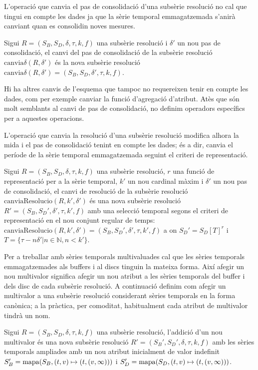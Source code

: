 L'operació que canvia el pas de consolidació d'una subsèrie resolució
no cal que tingui en compte les dades ja que la sèrie temporal
emmagatzemada s'anirà canviant quan es consolidin noves mesures.
\begin{definition}
  Sigui $R = (S_B,S_D,\delta,\tau,k,f)$ una subsèrie resolució i
  $\delta'$ un nou pas de consolidació, el canvi del pas de
  consolidació de la subsèrie resolució
  $\text{canvia}\delta(R,\delta')$ és la nova subsèrie resolució
  $\text{canvia}\delta(R,\delta')=(S_B,S_D,\delta',\tau,k,f)$.
\end{definition}

Hi ha altres canvis de l'esquema que tampoc no requereixen tenir en
compte les dades, com per exemple canviar la funció d'agregació
d'atribut. Atès que són molt semblants al canvi de pas de
consolidació, no definim operadors específics per a aquestes
operacions.


L'operació que canvia la resolució d'una subsèrie resolució modifica
alhora la mida i el pas de consolidació tenint en compte les dades; és
a dir, canvia el període de la sèrie temporal emmagatzemada seguint el
criteri de representació.
\begin{definition}
  Sigui $R = (S_B,S_D,\delta,\tau,k,f)$ una subsèrie resolució, $r$
  una funció de representació per a la sèrie temporal, $k'$ un nou
  cardinal màxim i $\delta'$ un nou pas de consolidació, el canvi de
  resolució de la subsèrie resolució
  $\text{canviaResolucio}(R,k',\delta')$ és una nova subsèrie
  resolució $R' = (S_B,S_D',\delta',\tau,k',f)$ amb una selecció
  temporal segons el criteri de representació en el nou conjunt
  regular de temps:
  $\text{canviaResolucio}(R,k',\delta')=(S_B,S_D',\delta',\tau,k',f)$
  a on $S_D' = S_D[T]^r$ i $T=\{ \tau-n\delta' | n\in\mathbb{N},n<k'
  \}$.
\end{definition}


Per a treballar amb sèries temporals multivaluades cal que les sèries
temporals emmagatzemades als buffers i al discs tinguin la mateixa
forma. Així afegir un nou multivalor significa afegir un nou atribut a
les sèries temporals del buffer i dels disc de cada subsèrie
resolució. A continuació definim com afegir un multivalor a una
subsèrie resolució considerant sèries temporals en la forma canònica;
a la pràctica, per comoditat, habitualment cada atribut de multivalor
tindrà un nom.
\begin{definition}
  Sigui $R = (S_B,S_D,\delta,\tau,k,f)$ una subsèrie resolució,
  l'addició d'un nou multivalor és una nova subsèrie resolució $R' =
  (S_B',S_D',\delta,\tau,k,f)$ amb les sèries temporals ampliades amb
  un nou atribut inicialment de valor indefinit $S'_{B} =
  \operatorname*{mapa}(S_B,(t,v)\mapsto(t,(v,\infty)))$ i $S'_{D} =
  \operatorname*{mapa}(S_D,(t,v)\mapsto(t,(v,\infty)))$.
\end{definition}





